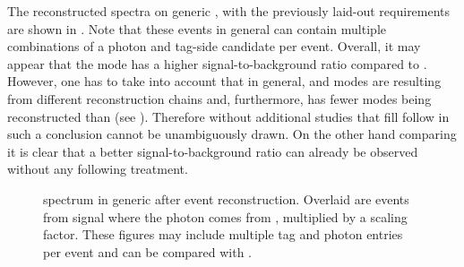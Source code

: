 The reconstructed \BtoXsgamma spectra on generic \MC, with the previously laid-out requirements are shown in .
Note that these events in general can contain multiple combinations of a photon and tag-side candidate per event.
Overall, it may appear that the \FEI \Bz mode has a higher signal-to-background ratio compared to \FEI \Bp.
However, one has to take into account that in general, \FEI \Bp and \FEI \Bz modes are 
resulting from different reconstruction chains and, furthermore, \FEI \Bz has fewer modes being reconstructed than \FEI \Bp (see ).
Therefore without additional studies that fill follow in  such a conclusion cannot be unambiguously drawn. 
On the other hand comparing  it is clear that a better signal-to-background ratio can already be observed without any following treatment.

\begin{figure}[htbp!]
    \centering
    \caption{\label{fig:spectrum_after_reco} \BtoXsgamma spectrum in generic \MC after event reconstruction.
    Overlaid are events from signal \MC where the photon comes from \BtoXsgamma, multiplied by a scaling factor.
    These figures may include multiple tag and photon entries per event and can be compared with .
    }
\end{figure}

